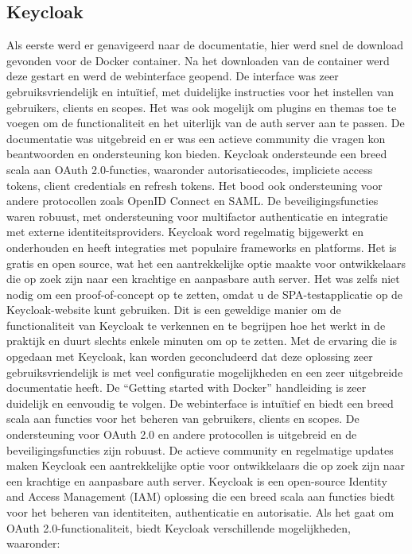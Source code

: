 \subsection{Keycloak}%
\label{subsec:keycloak}
Als eerste werd er genavigeerd naar de documentatie, hier werd snel de download gevonden voor de Docker container. Na het downloaden van de container werd deze gestart en werd de webinterface geopend. De interface was zeer gebruiksvriendelijk en intuïtief, met duidelijke instructies voor het instellen van gebruikers, clients en scopes. Het was ook mogelijk om plugins en themas toe te voegen om de functionaliteit en het uiterlijk van de auth server aan te passen. De documentatie was uitgebreid en er was een actieve community die vragen kon beantwoorden en ondersteuning kon bieden. Keycloak ondersteunde een breed scala aan OAuth 2.0-functies, waaronder autorisatiecodes, impliciete access tokens, client credentials en refresh tokens. Het bood ook ondersteuning voor andere protocollen zoals OpenID Connect en SAML. De beveiligingsfuncties waren robuust, met ondersteuning voor multifactor authenticatie en integratie met externe identiteitsproviders. Keycloak word regelmatig bijgewerkt en onderhouden en heeft integraties met populaire frameworks en platforms. Het is gratis en open source, wat het een aantrekkelijke optie maakte voor ontwikkelaars die op zoek zijn naar een krachtige en aanpasbare auth server.
Het was zelfs niet nodig om een proof-of-concept op te zetten, omdat u de SPA-testapplicatie op de Keycloak-website kunt gebruiken. Dit is een geweldige manier om de functionaliteit van Keycloak te verkennen en te begrijpen hoe het werkt in de praktijk en duurt slechts enkele minuten om op te zetten.
Met de ervaring die is opgedaan met Keycloak, kan worden geconcludeerd dat deze oplossing zeer gebruiksvriendelijk is met veel configuratie mogelijkheden en een zeer uitgebreide documentatie heeft. De ``Getting started with Docker'' handleiding is zeer duidelijk en eenvoudig te volgen. De webinterface is intuïtief en biedt een breed scala aan functies voor het beheren van gebruikers, clients en scopes. De ondersteuning voor OAuth 2.0 en andere protocollen is uitgebreid en de beveiligingsfuncties zijn robuust. De actieve community en regelmatige updates maken Keycloak een aantrekkelijke optie voor ontwikkelaars die op zoek zijn naar een krachtige en aanpasbare auth server.
\newline
Keycloak is een open-source Identity and Access Management (IAM) oplossing die een breed scala aan functies biedt voor het beheren van identiteiten, authenticatie en autorisatie. Als het gaat om OAuth 2.0-functionaliteit, biedt Keycloak verschillende mogelijkheden, waaronder:
